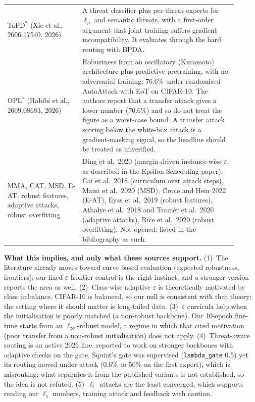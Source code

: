 \documentclass[11pt]{article}
\begin{document}
\begin{table}[h]
\begin{tabular}{p{0.30\linewidth}p{0.62\linewidth}}
TaFD$^\ast$ (Xie et al., 2606.17540, 2026) & A threat classifier plus per-threat experts for $\ell_p$ and semantic threats, with a first-order argument that joint training suffers gradient incompatibility. It evaluates through the hard routing with BPDA.\\
OPL$^\ast$ (Habibi et al., 2609.08683, 2026) & Robustness from an oscillatory (Kuramoto) architecture plus predictive pretraining, with no adversarial training: 76.6\% under randomised AutoAttack with EoT on CIFAR-10. The authors report that a transfer attack gives a lower number (70.6\%) and so do not treat the figure as a worst-case bound. A transfer attack scoring below the white-box attack is a gradient-masking signal, so the headline should be treated as unverified.\\
MMA, CAT, MSD, E-AT, robust features, adaptive attacks, robust overfitting & Ding et al.\ 2020 (margin-driven instance-wise $\varepsilon$, as described in the Epsilon-Scheduling paper), Cai et al.\ 2018 (curriculum over attack steps), Maini et al.\ 2020 (MSD), Croce and Hein 2022 (E-AT), Ilyas et al.\ 2019 (robust features), Athalye et al.\ 2018 and Tram\`er et al.\ 2020 (adaptive attacks), Rice et al.\ 2020 (robust overfitting). Not opened; listed in the bibliography as such.\\\bottomrule
\end{tabular}
\end{table}
\textbf{What this implies, and only what these sources support.}
(1)~The literature already moves toward curve-based evaluation (expected robustness, frontiers); our fixed-$\varepsilon$ frontier control is the right instinct, and a stronger version reports the area as well.
(2)~Class-wise adaptive $\varepsilon$ is theoretically motivated by class imbalance. CIFAR-10 is balanced, so our null is consistent with that theory; the setting where it should matter is long-tailed data.
(3)~$\varepsilon$ curricula help when the initialisation is poorly matched (a non-robust backbone). Our 10-epoch fine-tune starts from an $\ell_\infty$-robust model, a regime in which that cited motivation (poor transfer from a non-robust initialisation) does not apply.
(4)~Threat-aware routing is an active 2026 line, reported to work on stronger backbones with adaptive checks on the gate. Squint's gate was supervised (\texttt{lambda\_gate} 0.5) yet its routing moved under attack (0.6\% to 50\% on the first expert), which is misrouting; what separates it from the published variants is not established, so the idea is not refuted.
(5)~$\ell_1$ attacks are the least converged, which supports reading our $\ell_1$ numbers, training attack and feedback with caution.
\end{document}
